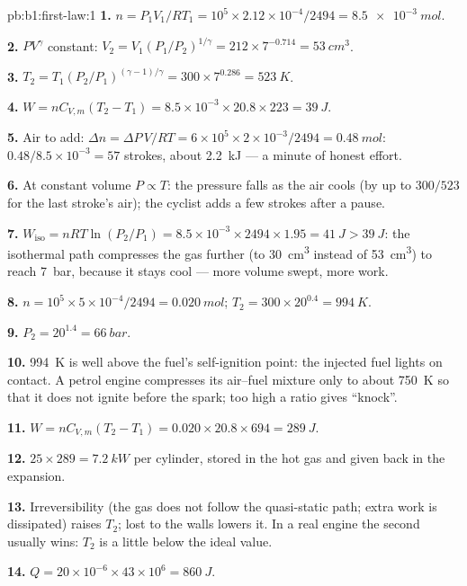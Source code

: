 \begin{solution}{pb:b1:first-law:1}
\textbf{1.} $n = P_1V_1/RT_1 = 10^5 \times 2.12\times10^{-4}/2494 = \qty{8.5e-3}{mol}$.

\textbf{2.} $PV^\gamma$ constant: $V_2 = V_1(P_1/P_2)^{1/\gamma} = 212 \times
7^{-0.714} = \qty{53}{cm^3}$.

\textbf{3.} $T_2 = T_1(P_2/P_1)^{(\gamma - 1)/\gamma} = 300 \times 7^{0.286} =
\qty{523}{K}$.

\textbf{4.} $W = nC_{V,m}(T_2 - T_1) = 8.5\times10^{-3} \times 20.8 \times 223 =
\qty{39}{J}$.

\textbf{5.} Air to add: $\Delta n = \Delta P\,V/RT = 6\times10^5 \times 2\times10^{-3}/
2494 = \qty{0.48}{mol}$: $0.48/8.5\times10^{-3} = 57$ strokes, about
\qty{2.2}{kJ} --- a minute of honest effort.

\textbf{6.} At constant volume $P \propto T$: the pressure falls as the air
cools (by up to $300/523$ for the last stroke's air); the cyclist adds a
few strokes after a pause.

\textbf{7.} $W_{\text{iso}} = nRT\ln(P_2/P_1) = 8.5\times10^{-3} \times 2494 \times
1.95 = \qty{41}{J} > \qty{39}{J}$: the isothermal path compresses the gas
further (to \qty{30}{cm^3} instead of \qty{53}{cm^3}) to reach \qty{7}{bar},
because it stays cool --- more volume swept, more work.

\textbf{8.} $n = 10^5 \times 5\times10^{-4}/2494 = \qty{0.020}{mol}$; $T_2 =
300 \times 20^{0.4} = \qty{994}{K}$.

\textbf{9.} $P_2 = 20^{1.4} = \qty{66}{bar}$.

\textbf{10.} \qty{994}{K} is well above the fuel's self-ignition point: the
injected fuel lights on contact. A petrol engine compresses its
air--fuel mixture only to about \qty{750}{K} so that it does not ignite
before the spark; too high a ratio gives ``knock''.

\textbf{11.} $W = nC_{V,m}(T_2 - T_1) = 0.020 \times 20.8 \times 694 = \qty{289}{J}$.

\textbf{12.} $25 \times 289 = \qty{7.2}{kW}$ per cylinder, stored in the hot
gas and given back in the expansion.

\textbf{13.} Irreversibility (the gas does not follow the quasi-static
path; extra work is dissipated) raises $T_2$;  lost to the walls
lowers it. In a real engine the second usually wins: $T_2$ is a little
below the ideal value.

\textbf{14.} $Q = 20\times10^{-6} \times 43\times10^6 = \qty{860}{J}$.


\end{solution}
